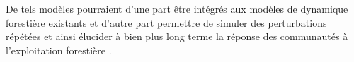 \documentclass[
  11pt,
  french,
  A4paper,
  extrafontsizes,onecolumn,openright
  ]{memoir}
\begin{document}
De tels modèles pourraient d'une part être intégrés aux modèles de
dynamique forestière existants et d'autre part permettre de simuler des
perturbations répétées et ainsi élucider à bien plus long terme la
réponse des communautés à l'exploitation forestière
\autocite{Dufour2012}.



\backmatter
\SmallMargins

%
\printbibliography










\evenpage
\SmallMargins
\thispagestyle{empty}
\end{document}
